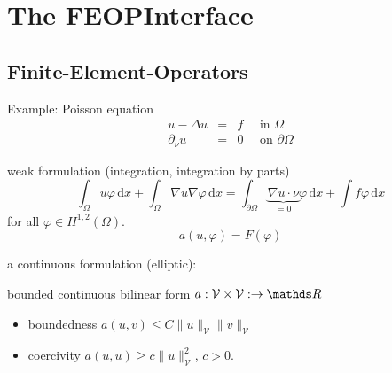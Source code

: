 




\chapter{The FEOPInterface}

\newcommand{\dx}{\,\mathrm{d}x}
\newcommand{\V}{{\mathcal V}}

\section{Finite-Element-Operators}

Example: Poisson equation
\begin{eqnarray*}
 u - \Delta u & = & f  \quad \mbox{ in } \Omega \\
\partial_\nu u &=& 0 \quad \mbox{ on } \partial \Omega
\end{eqnarray*}

weak formulation (integration, integration by parts)
\begin{equation}
\int_\Omega  u \varphi \dx + \int_\Omega \nabla u \nabla \varphi \dx = \int_{\partial \Omega } \underbrace{\nabla u \cdot \nu}_{=0} \varphi \dx + \int f \varphi \dx
\end{equation}
for all $\varphi\in H^{1,2}(\Omega)$.
\begin{equation}
 a(u,\varphi) = F( \varphi )
\end{equation}

a continuous formulation (elliptic):

bounded continuous bilinear form $a:\V\times\V:\to \R$
\begin{itemize}
\item boundedness $a(u,v) \leq C \|u\|_{\V}\|v\|_{\V}$
\item coercivity $a(u,u) \geq c \|u\|_{\V}^2$, $c>0$.
\end{itemize}

